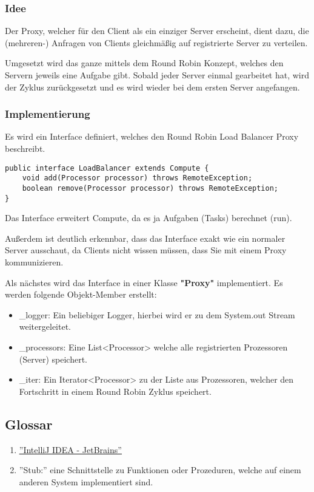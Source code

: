 \subsubsection{Idee}
Der Proxy, welcher für den Client als ein einziger Server erscheint, dient dazu, die (mehreren-) Anfragen von Clients gleichmäßig auf registrierte Server zu verteilen.

Umgesetzt wird das ganze mittels dem Round Robin Konzept, welches den Servern jeweils eine Aufgabe gibt. Sobald jeder Server einmal gearbeitet hat, wird der Zyklus zurückgesetzt und es wird wieder bei dem ersten Server angefangen.

\subsubsection{Implementierung}
Es wird ein Interface definiert, welches den Round Robin Load Balancer Proxy beschreibt.

\begin{lstlisting}[style=Java, caption=Proxy Implementation - LoadBalancer Interface]
public interface LoadBalancer extends Compute {
    void add(Processor processor) throws RemoteException;
	boolean remove(Processor processor) throws RemoteException;
}
\end{lstlisting}

Das Interface erweitert Compute, da es ja Aufgaben (Tasks) berechnet (run).

Außerdem ist deutlich erkennbar, dass das Interface exakt wie ein normaler Server ausschaut, da Clients nicht wissen müssen, dass Sie mit einem Proxy kommunizieren.

Als nächstes wird das Interface in einer Klasse \textbf{"Proxy"} implementiert.
Es werden folgende Objekt-Member erstellt:

\begin{itemize}
	\item _logger: Ein beliebiger Logger, hierbei wird er zu dem System.out Stream weitergeleitet.
	\item _processors: Eine List<Processor> welche alle registrierten Prozessoren (Server) speichert.
	\item _iter: Ein Iterator<Processor> zu der Liste aus Prozessoren, welcher den Fortschritt in einem Round Robin Zyklus speichert.
\end{itemize}

\subsection{Glossar}
\begin{enumerate}
    \item \href{https://www.jetbrains.com/idea}{\color{blue}\underline{''IntelliJ IDEA - JetBrains''}}
    \item ''Stub:'' eine Schnittstelle zu Funktionen oder Prozeduren, welche auf einem anderen System implementiert sind.
\end{enumerate}


